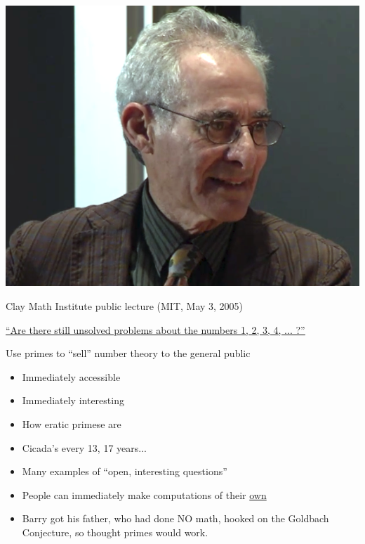 \documentclass{beamer}
\begin{document}
\begin{frame}
\begin{center}
\includegraphics[height=.7\textheight]{pics/barry-msri}
\end{center}

\end{frame}


\begin{frame}{Clay Math Institute public lecture (MIT, May 3, 2005)}
  \begin{center}
    \href{http://www.claymath.org/library/public\_lectures/mazur\_riemann\_hypothesis.pdf}{\small\underline{``Are there still unsolved problems about the numbers 1, 2, 3, 4, ... ?''}}
  \end{center}

  \vfill

  \begin{block}{Use primes to ``sell'' number theory to the general public}
    \begin{itemize}
      \item   Immediately accessible
      \item   Immediately interesting
      \item   How eratic primese are
      \item   Cicada's every 13, 17 years...
      \item   Many examples of ``open, interesting questions''
      \item   People can immediately make computations of their \underline{own}
      \item   Barry got his father, who had done NO
            math, hooked on the Goldbach Conjecture, so thought
            primes would work.
    \end{itemize}
  \end{block}
\end{frame}
\end{document}
